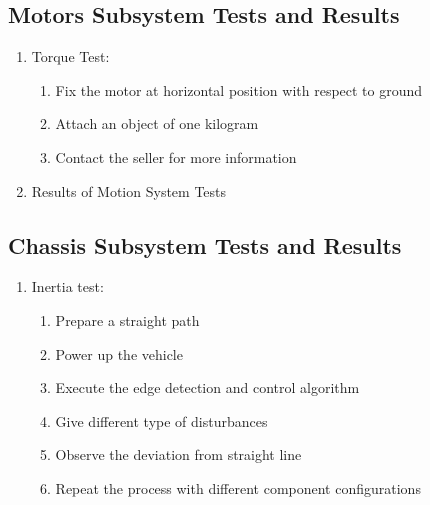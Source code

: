 \documentclass[a4paper,12pt]{article}
\begin{document}
\subsection {Motors Subsystem Tests and Results} 


\begin{enumerate}

\item {Torque Test:} 

\begin{enumerate}

\item Fix the motor at horizontal position with respect to ground  

\item Attach an object of one kilogram  

\item Contact the seller for more information 

\end{enumerate}







\item{Results of Motion System Tests}

\end{enumerate}







\subsection {Chassis Subsystem Tests and Results}

\begin{enumerate}

\item Inertia test: 

\begin{enumerate}

\item Prepare a straight path

\item Power up the vehicle 

\item Execute the edge detection and control algorithm

\item Give different type of disturbances 

\item Observe the deviation from straight line

\item Repeat the process with different component configurations

\end{enumerate} 

\end{enumerate}
\end{document}
